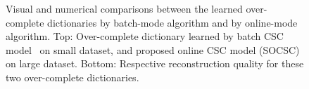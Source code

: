 \begin{figure}[h]
  \caption{ Visual and numerical comparisons between the learned over-complete dictionaries by batch-mode algorithm and by online-mode algorithm. Top: Over-complete dictionary learned by batch CSC model~\cite{heide2015fast} on small dataset, and proposed online CSC model (SOCSC) on large dataset. Bottom: Respective reconstruction quality for these two over-complete dictionaries.}
  \label{fig:overCompleteDic-dataset}
\end{figure}
